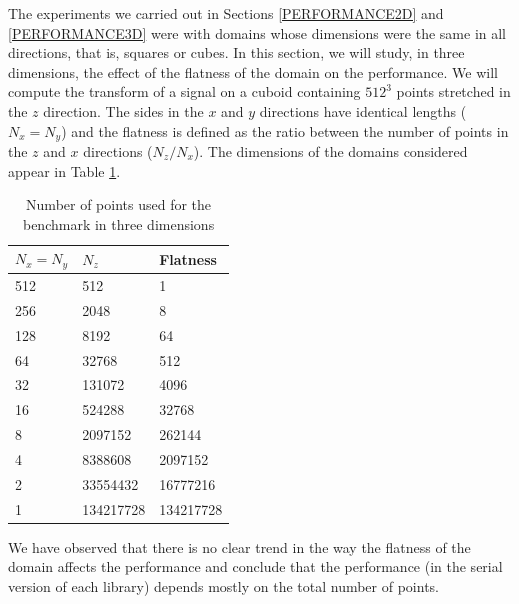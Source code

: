\documentclass[12pt, a4paper]{article} \setlength{\textheight}{24cm}
\begin{document}
The experiments we carried out in Sections \ref{PERFORMANCE2D} and
\ref{PERFORMANCE3D} were with domains whose dimensions were the same
in all directions, that is, squares or cubes. In this section, we will
study, in three dimensions, the effect of the flatness of the domain
on the performance. We will compute the transform of a signal on a
cuboid containing $512^3$ points stretched in the $z$ direction. The
sides in the $x$ and $y$ directions have identical lengths ($N_x=N_y$)
and the flatness is defined as the ratio between the number of points
in the $z$ and $x$ directions ($N_z/N_x$). The dimensions of the
domains considered appear in Table \ref{FLATNESSDIM}.
\begin{table}[H]
  \centering
  \begin{tabular}{|l|l|l|}
    \hline
    $N_x=N_y$ & $N_z $ & Flatness\\ 
    \hline
    \hline
    512 & 512       & 1\\ \hline
    256 & 2048      & 8\\ \hline
    128 & 8192      & 64\\ \hline
    64  & 32768     & 512\\ \hline
    32  & 131072    & 4096\\ \hline
    16  & 524288    & 32768\\ \hline
    8   & 2097152   & 262144\\ \hline
    4   & 8388608   & 2097152\\ \hline
    2   & 33554432  & 16777216\\ \hline
    1   & 134217728 & 134217728\\ \hline
  \end{tabular}
  \caption{Number of points used for the benchmark in three dimensions}\label{FLATNESSDIM}
\end{table}

We have observed that there is no clear trend in the way the flatness
of the domain affects the performance and conclude that the
performance (in the serial version of each library) depends mostly on the total number of points.
\end{document}
